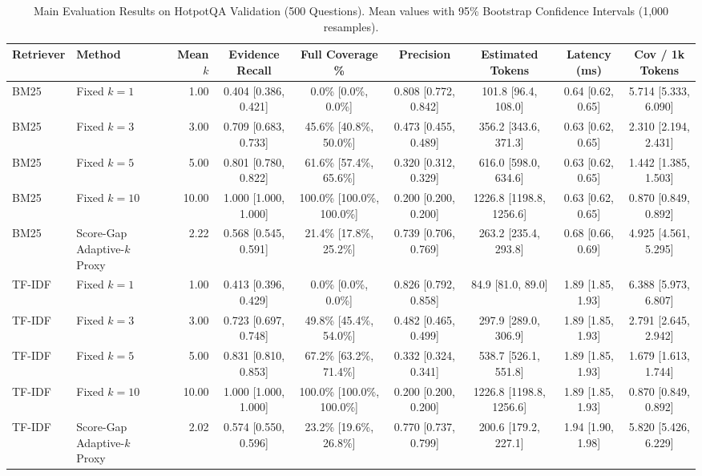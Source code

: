 \documentclass[conference]{IEEEtran}
\begin{document}
\begin{table}[t]
\centering
\caption{Main Evaluation Results on HotpotQA Validation (500 Questions). Mean values with 95\% Bootstrap Confidence Intervals (1,000 resamples).}
\label{tab:main_results}
\begin{tabular}{llrcccccc}
\toprule
\textbf{Retriever} & \textbf{Method} & \textbf{Mean $k$} & \textbf{Evidence Recall} & \textbf{Full Coverage \%} & \textbf{Precision} & \textbf{Estimated Tokens} & \textbf{Latency (ms)} & \textbf{Cov / 1k Tokens} \\
\midrule
BM25 & Fixed $k=1$ & 1.00 & 0.404 [0.386, 0.421] & \phantom{0}0.0\% [\phantom{0}0.0\%, \phantom{0}0.0\%] & 0.808 [0.772, 0.842] & 101.8 [96.4, 108.0] & 0.64 [0.62, 0.65] & 5.714 [5.333, 6.090] \\
BM25 & Fixed $k=3$ & 3.00 & 0.709 [0.683, 0.733] & 45.6\% [40.8\%, 50.0\%] & 0.473 [0.455, 0.489] & 356.2 [343.6, 371.3] & 0.63 [0.62, 0.65] & 2.310 [2.194, 2.431] \\
BM25 & Fixed $k=5$ & 5.00 & 0.801 [0.780, 0.822] & 61.6\% [57.4\%, 65.6\%] & 0.320 [0.312, 0.329] & 616.0 [598.0, 634.6] & 0.63 [0.62, 0.65] & 1.442 [1.385, 1.503] \\
BM25 & Fixed $k=10$ & 10.00 & 1.000 [1.000, 1.000] & 100.0\% [100.0\%, 100.0\%] & 0.200 [0.200, 0.200] & 1226.8 [1198.8, 1256.6] & 0.63 [0.62, 0.65] & 0.870 [0.849, 0.892] \\
BM25 & Score-Gap Adaptive-$k$ Proxy & 2.22 & 0.568 [0.545, 0.591] & 21.4\% [17.8\%, 25.2\%] & 0.739 [0.706, 0.769] & 263.2 [235.4, 293.8] & 0.68 [0.66, 0.69] & 4.925 [4.561, 5.295] \\
\midrule
TF-IDF & Fixed $k=1$ & 1.00 & 0.413 [0.396, 0.429] & \phantom{0}0.0\% [\phantom{0}0.0\%, \phantom{0}0.0\%] & 0.826 [0.792, 0.858] & \phantom{0}84.9 [81.0, 89.0] & 1.89 [1.85, 1.93] & 6.388 [5.973, 6.807] \\
TF-IDF & Fixed $k=3$ & 3.00 & 0.723 [0.697, 0.748] & 49.8\% [45.4\%, 54.0\%] & 0.482 [0.465, 0.499] & 297.9 [289.0, 306.9] & 1.89 [1.85, 1.93] & 2.791 [2.645, 2.942] \\
TF-IDF & Fixed $k=5$ & 5.00 & 0.831 [0.810, 0.853] & 67.2\% [63.2\%, 71.4\%] & 0.332 [0.324, 0.341] & 538.7 [526.1, 551.8] & 1.89 [1.85, 1.93] & 1.679 [1.613, 1.744] \\
TF-IDF & Fixed $k=10$ & 10.00 & 1.000 [1.000, 1.000] & 100.0\% [100.0\%, 100.0\%] & 0.200 [0.200, 0.200] & 1226.8 [1198.8, 1256.6] & 1.89 [1.85, 1.93] & 0.870 [0.849, 0.892] \\
TF-IDF & Score-Gap Adaptive-$k$ Proxy & 2.02 & 0.574 [0.550, 0.596] & 23.2\% [19.6\%, 26.8\%] & 0.770 [0.737, 0.799] & 200.6 [179.2, 227.1] & 1.94 [1.90, 1.98] & 5.820 [5.426, 6.229] \\
\bottomrule
\end{tabular}
\end{table}
\end{document}

